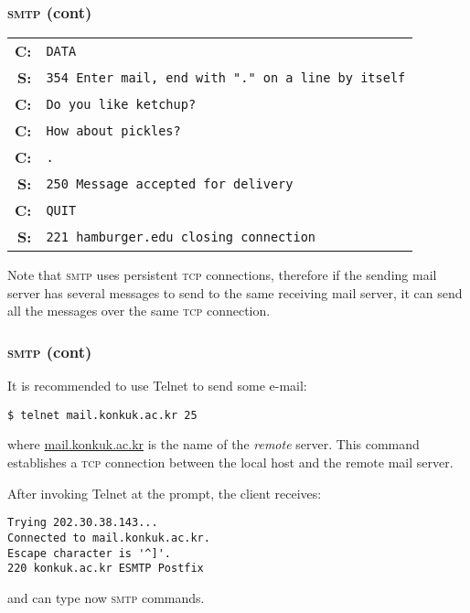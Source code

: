 %
\begin{frame}[containsverbatim]
\frametitle{\textsc{smtp} (cont)}

{\small
\begin{tabular}{rl}
\textbf{C:} & \verb+DATA+\\
\textbf{S:} & \verb+354 Enter mail, end with "." on a line by itself+\\
\textbf{C:} & \verb+Do you like ketchup?+\\
\textbf{C:} & \verb+How about pickles?+\\
\textbf{C:} & \verb+.+\\
\textbf{S:} & \verb+250 Message accepted for delivery+\\
\textbf{C:} & \verb+QUIT+\\
\textbf{S:} & \verb+221 hamburger.edu closing connection+
\end{tabular}
}

Note that \textsc{smtp} uses persistent \textsc{tcp} connections,
therefore if the sending mail server has several messages to send to
the same receiving mail server, it can send all the messages over the
same \textsc{tcp} connection.

\end{frame}

%
\begin{frame}[containsverbatim]
\frametitle{\textsc{smtp} (cont)}

It is recommended to use \textsf{Telnet} to send some e-mail:
\begin{verbatim}
$ telnet mail.konkuk.ac.kr 25
\end{verbatim}
where \url{mail.konkuk.ac.kr} is the name of the \emph{remote}
server. This command establishes a \textsc{tcp} connection between the
local host and the remote mail server.

After invoking \textsf{Telnet} at the prompt, the client receives:
{\small
\begin{verbatim}
Trying 202.30.38.143...
Connected to mail.konkuk.ac.kr.
Escape character is '^]'.
220 konkuk.ac.kr ESMTP Postfix
\end{verbatim}
}
and can type now \textsc{smtp} commands.

\end{frame}

